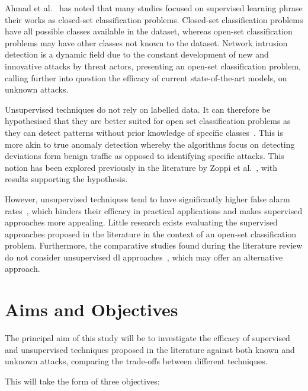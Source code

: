 Ahmad et al.~\cite{zero-day} has noted that many studies focused on supervised
learning phrase their works as closed-set classification problems. Closed-set
classification problems have all possible classes available in the dataset,
whereas open-set classification problems may have other classes not known to
the dataset. Network intrusion detection is a dynamic field due to the constant
development of new and innovative attacks by threat actors, presenting an
open-set classification problem, calling further into question the efficacy of
current state-of-the-art models, on unknown attacks.

Unsupervised techniques do not rely on labelled data. It can therefore be
hypothesised that they are better suited for open set classification problems
as they can detect patterns without prior knowledge of specific
classes~\cite{unsupervised_ml}. This is more akin to true anomaly detection
whereby the algorithms focus on detecting deviations form benign traffic as
opposed to identifying specific attacks. This notion has been explored
previously in the literature by Zoppi et al.~\cite{Zoppi}, with results
supporting the hypothesis.

However, unsupervised techniques tend to have significantly higher false alarm
rates~\cite{Zoppi}, which hinders their efficacy in practical applications and
makes supervised approaches more appealing. Little research exists evaluating
the supervised approaches proposed in the literature in the context of an
open-set classification problem. Furthermore, the comparative studies found
during the literature review do not consider unsupervised \gls{dl}
approaches~\cite{Kus, Zoppi}, which may offer an alternative approach.

\section{Aims and Objectives}%
\label{sec:aims}

The principal aim of this study will be to investigate the efficacy of
supervised and unsupervised techniques proposed in the literature against both
known and unknown attacks, comparing the trade-offs between different
techniques.

This will take the form of three objectives:

\hypertarget{obj}{}

\begin{center}
\end{center}

